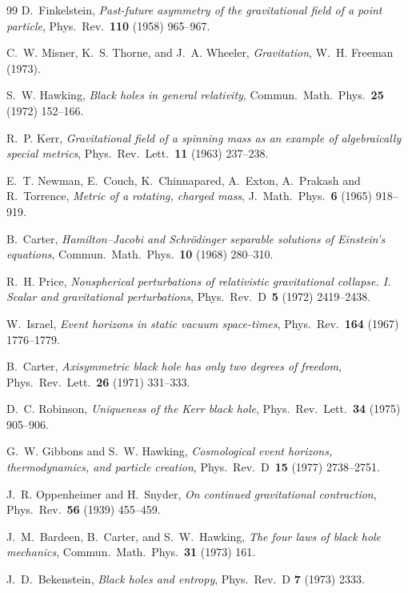 \documentclass[11pt,a4paper]{article}
\theoremstyle{plain}
\theoremstyle{remark}
\begin{document}
\begin{thebibliography}{99}
D.~Finkelstein,
\emph{Past-future asymmetry of the gravitational field of a point particle},
Phys.~Rev.~\textbf{110} (1958) 965--967.

C.~W. Misner, K.~S. Thorne, and J.~A. Wheeler,
\emph{Gravitation},
W.~H. Freeman (1973).

S.~W. Hawking,
\emph{Black holes in general relativity},
Commun.~Math.~Phys.~\textbf{25} (1972) 152--166.

R.~P. Kerr,
\emph{Gravitational field of a spinning mass as an example of algebraically special metrics},
Phys.~Rev.~Lett.~\textbf{11} (1963) 237--238.

E.~T. Newman, E.~Couch, K.~Chinnapared, A.~Exton, A.~Prakash and R.~Torrence,
\emph{Metric of a rotating, charged mass},
J.~Math.~Phys.~\textbf{6} (1965) 918--919.

B.~Carter,
\emph{Hamilton--Jacobi and Schr\"odinger separable solutions of Einstein's equations},
Commun.~Math.~Phys.~\textbf{10} (1968) 280--310.

R.~H. Price,
\emph{Nonspherical perturbations of relativistic gravitational collapse. I. Scalar and gravitational perturbations},
Phys.~Rev.~D~\textbf{5} (1972) 2419--2438.

W.~Israel,
\emph{Event horizons in static vacuum space-times},
Phys.~Rev.~\textbf{164} (1967) 1776--1779.

B.~Carter,
\emph{Axisymmetric black hole has only two degrees of freedom},
Phys.~Rev.~Lett.~\textbf{26} (1971) 331--333.

D.~C. Robinson,
\emph{Uniqueness of the Kerr black hole},
Phys.~Rev.~Lett.~\textbf{34} (1975) 905--906.

G.~W. Gibbons and S.~W. Hawking,
\emph{Cosmological event horizons, thermodynamics, and particle creation},
Phys.~Rev.~D~\textbf{15} (1977) 2738--2751.

J.~R. Oppenheimer and H.~Snyder,
\emph{On continued gravitational contraction},
Phys.~Rev.~\textbf{56} (1939) 455--459.

J.~M.~Bardeen, B.~Carter, and S.~W.~Hawking,
\emph{The four laws of black hole mechanics}, Commun.\ Math.\ Phys.\ \textbf{31} (1973) 161.

J.~D.~Bekenstein,
\emph{Black holes and entropy}, Phys.\ Rev.\ D \textbf{7} (1973) 2333.


\end{thebibliography}
\end{document}
